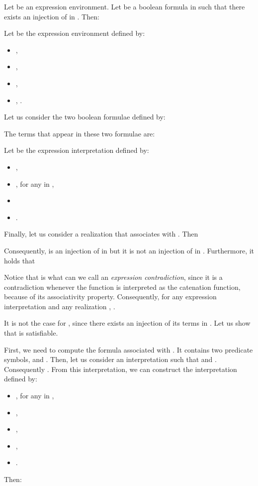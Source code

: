 \documentclass[a4paper]{llncs}
\begin{document}
  \begin{corollary}\label{cor tphi sat phi aussi}
    Let  be an expression environment. Let  be a boolean formula in  such that there exists an injection of  in . Then:
        
  \end{corollary}
  
  \begin{example}\label{ex inj form}
    Let  be the expression environment defined by:
    \begin{itemize}
      \item ,
      \item ,
      \item ,
      \item , .
    \end{itemize}
    Let us consider the two boolean formulae defined by:
        
        The terms that appear in these two formulae are:
        
        Let  be the expression interpretation defined by:
    \begin{itemize}
      \item ,
      \item , for any  in , 
      \item 
      \item .
    \end{itemize} 
    Finally, let us consider a realization  that associates  with .  Then
        
        Consequently,  is an injection of  in  but it is not an injection of  in . Furthermore, it holds that
        
        Notice that  is what can we call an \emph{expression contradiction}, since it is a contradiction whenever the function  is interpreted as the catenation function, because of its associativity property. Consequently, for any expression interpretation  and any realization , .
  
  \noindent It is not the case for , since there exists an injection of its terms in . Let us show that  is satisfiable.
  
  \noindent First, we need to compute the formula   associated with . It contains two predicate symbols,  and . Then, let us consider an interpretation  such that  and . Consequently . From this interpretation, we can construct the interpretation  defined by:
    \begin{itemize}
      \item , for any  in , 
      \item ,
      \item ,      
      \item ,
      \item .
    \end{itemize} 
    Then:
        

\end{example}
\end{document}
